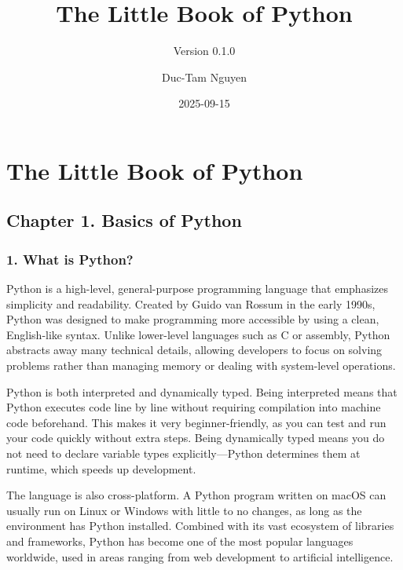 \documentclass[
  letterpaper,
  DIV=11,
  numbers=noendperiod]{scrreprt}
\title{The Little Book of Python}
\subtitle{Version 0.1.0}
\author{Duc-Tam Nguyen}
\date{2025-09-15}
\renewcommand*\contentsname{Table of contents}
\newcommand\contentsname{Table of contents}
\begin{document}
\maketitle

\renewcommand*\contentsname{Table of contents}
{
\hypersetup{linkcolor=}
\setcounter{tocdepth}{2}
\tableofcontents
}


\chapter{The Little Book of Python}\label{the-little-book-of-python}

\section{Chapter 1. Basics of Python}\label{chapter-1.-basics-of-python}

\subsection{1. What is Python?}\label{what-is-python}

Python is a high-level, general-purpose programming language that
emphasizes simplicity and readability. Created by Guido van Rossum in
the early 1990s, Python was designed to make programming more accessible
by using a clean, English-like syntax. Unlike lower-level languages such
as C or assembly, Python abstracts away many technical details, allowing
developers to focus on solving problems rather than managing memory or
dealing with system-level operations.

Python is both interpreted and dynamically typed. Being interpreted
means that Python executes code line by line without requiring
compilation into machine code beforehand. This makes it very
beginner-friendly, as you can test and run your code quickly without
extra steps. Being dynamically typed means you do not need to declare
variable types explicitly---Python determines them at runtime, which
speeds up development.

The language is also cross-platform. A Python program written on macOS
can usually run on Linux or Windows with little to no changes, as long
as the environment has Python installed. Combined with its vast
ecosystem of libraries and frameworks, Python has become one of the most
popular languages worldwide, used in areas ranging from web development
to artificial intelligence.
\end{document}
